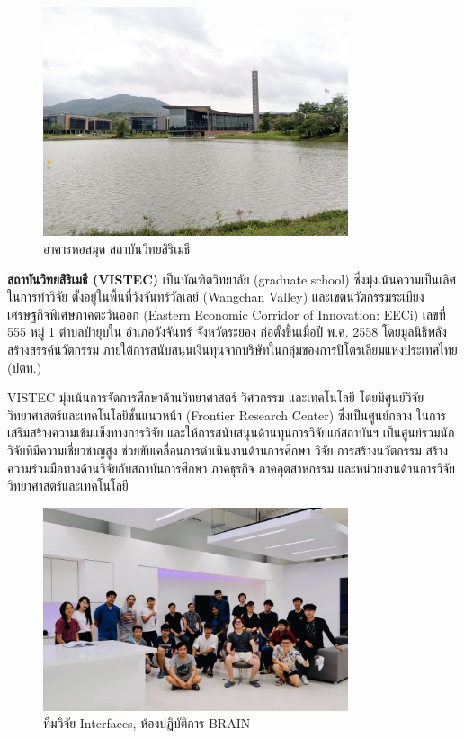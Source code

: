 \documentclass[16pt,a4]{internshipreport}
\begin{document}
\begin{figure}[H]
    \centering
    \includegraphics[width=0.8\textwidth]{images/vistec_v.jpg}
    \caption{อาคารหอสมุด สถาบันวิทยสิริเมธี}
\end{figure}

\textbf{สถาบันวิทยสิริเมธี (VISTEC)} เป็นบัณฑิตวิทยาลัย (graduate school) ซึ่งมุ่งเน้นความเป็นเลิศในการทำวิจัย ตั้งอยู่ในพื้นที่วังจันทร์วัลเลย์ (Wangchan Valley) และเขตนวัตกรรมระเบียงเศรษฐกิจพิเศษภาคตะวันออก (Eastern Economic Corridor of Innovation: EECi) เลขที่ 555 หมู่ 1 ตำบลป่ายุบใน อำเภอวังจันทร์ จังหวัดระยอง ก่อตั้งขึ้นเมื่อปี พ.ศ. 2558 โดยมูลนิธิพลังสร้างสรรค์นวัตกรรม ภายใต้การสนับสนุนเงินทุนจากบริษัทในกลุ่มของการปิโตรเลียมแห่งประเทศไทย (ปตท.)

VISTEC มุ่งเน้นการจัดการศึกษาด้านวิทยาศาสตร์ วิศวกรรม และเทคโนโลยี โดยมีศูนย์วิจัยวิทยาศาสตร์และเทคโนโลยีชั้นแนวหน้า (Frontier Research Center) ซึ่งเป็นศูนย์กลาง ในการเสริมสร้างความเข้มแข็งทางการวิจัย และให้การสนับสนุนด้านทุนการวิจัยแก่สถาบันฯ เป็นศูนย์รวมนักวิจัยที่มีความเชี่ยวชาญสูง ช่วยขับเคลื่อนการดำเนินงานด้านการศึกษา วิจัย การสร้างนวัตกรรม สร้างความร่วมมือทางด้านวิจัยกับสถาบันการศึกษา ภาคธุรกิจ ภาคอุตสาหกรรม
และหน่วยงานด้านการวิจัยวิทยาศาสตร์และเทคโนโลยี

\begin{figure}[H]
    \centering
    \includegraphics[width=0.8\textwidth]{images/brain_team_2019.jpg}
    \caption{ทีมวิจัย Interfaces, ห้องปฏิบัติการ BRAIN}
\end{figure}
\end{document}
